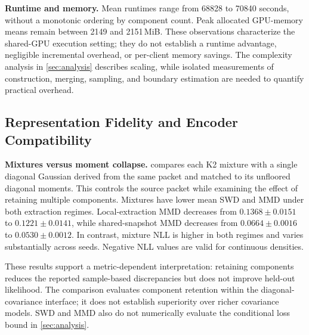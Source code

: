 \noindent\textbf{Runtime and memory.} Mean runtimes range from 68828 to 70840 seconds, without a monotonic ordering by component count. Peak allocated GPU-memory means remain between 2149 and 2151\,MiB. These observations characterize the shared-GPU execution setting; they do not establish a runtime advantage, negligible incremental overhead, or per-client memory savings. The complexity analysis in \cref{sec:analysis} describes scaling, while isolated measurements of construction, merging, sampling, and boundary estimation are needed to quantify practical overhead.

\subsection{Representation Fidelity and Encoder Compatibility}

\noindent\textbf{Mixtures versus moment collapse.}  compares each K2 mixture with a single diagonal Gaussian derived from the same packet and matched to its unfloored diagonal moments. This controls the source packet while examining the effect of retaining multiple components.
Mixtures have lower mean SWD and MMD under both extraction regimes. Local-extraction MMD decreases from $0.1368\pm0.0151$ to $0.1221\pm0.0141$, while shared-snapshot MMD decreases from $0.0664\pm0.0016$ to $0.0530\pm0.0012$. In contrast, mixture NLL is higher in both regimes and varies substantially across seeds. Negative NLL values are valid for continuous densities.

These results support a metric-dependent interpretation: retaining components reduces the reported sample-based discrepancies but does not improve held-out likelihood. The comparison evaluates component retention within the diagonal-covariance interface; it does not establish superiority over richer covariance models. SWD and MMD also do not numerically evaluate the conditional loss bound in \cref{sec:analysis}.

